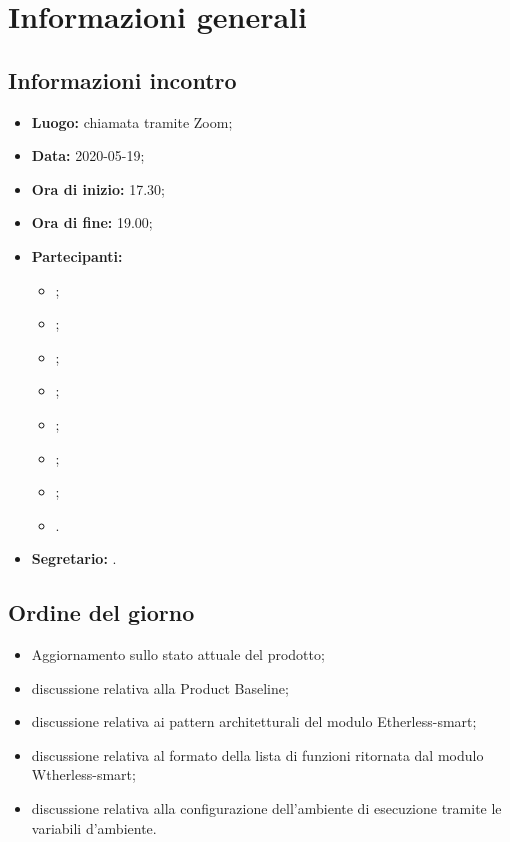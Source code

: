 \section{Informazioni generali}
\subsection{Informazioni incontro}
\begin{itemize}
	\item \textbf{Luogo:} chiamata tramite Zoom;
	\item \textbf{Data:} 2020-05-19;
	\item \textbf{Ora di inizio:} 17.30;
	\item \textbf{Ora di fine:} 19.00;
	\item \textbf{Partecipanti:}
		\begin{itemize}
			\item \VB;
			\item \LB;
			\item \NF;
			\item \EG;
			\item \FJ;
			\item \MP;
			\item \AS;
			\item \AZ.
		\end{itemize}
	\item \textbf{Segretario:} \AZ.
\end{itemize}

\subsection{Ordine del giorno}
\begin{itemize}
	\item Aggiornamento sullo stato attuale del prodotto;
	\item discussione relativa alla Product Baseline;
	\item discussione relativa ai pattern architetturali del modulo Etherless-smart;
	\item discussione relativa al formato della lista di funzioni ritornata dal modulo Wtherless-smart;
	\item discussione relativa alla configurazione dell'ambiente di esecuzione tramite le variabili d'ambiente.
\end{itemize}
